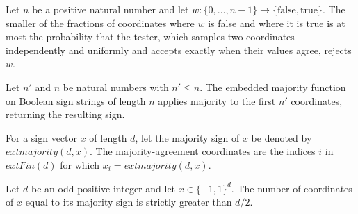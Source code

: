 \begin{theorem}
\label{FABL.allEqualStringDistance_le_rejectionProbability}
\leanok
{}
Let $n$ be a positive natural number and let
$w:\{0,\ldots,n-1\}\to\{\mathrm{false},\mathrm{true}\}$. The smaller of the fractions of
coordinates where $w$ is false and where it is true is at most the probability that the
tester, which samples two coordinates independently and uniformly and accepts exactly
when their values agree, rejects $w$.
\end{theorem}

\begin{definition}
\label{FABL.embeddedMajority}
\leanok
{}
Let $n'$ and $n$ be natural numbers with $n'\le n$. The embedded majority function on
Boolean sign strings of length $n$ applies majority to the first $n'$ coordinates,
returning the resulting sign.
\end{definition}

\begin{definition}
\label{FABL.majorityAgreementCoordinates}
\leanok
{}
For a sign vector $x$ of length $d$, let the majority sign of $x$ be denoted by
$	ext{majority}(d,x)$. The majority-agreement coordinates are the indices $i$ in
$	ext{Fin}(d)$ for which $x_i=	ext{majority}(d,x)$.
\end{definition}

\begin{theorem}
\label{FABL.majorityAgreementCoordinates_card}
\leanok
{}
Let $d$ be an odd positive integer and let $x\in\{−1,1\}^d$. The number of coordinates
of $x$ equal to its majority sign is strictly greater than $d/2$.
\end{theorem}

